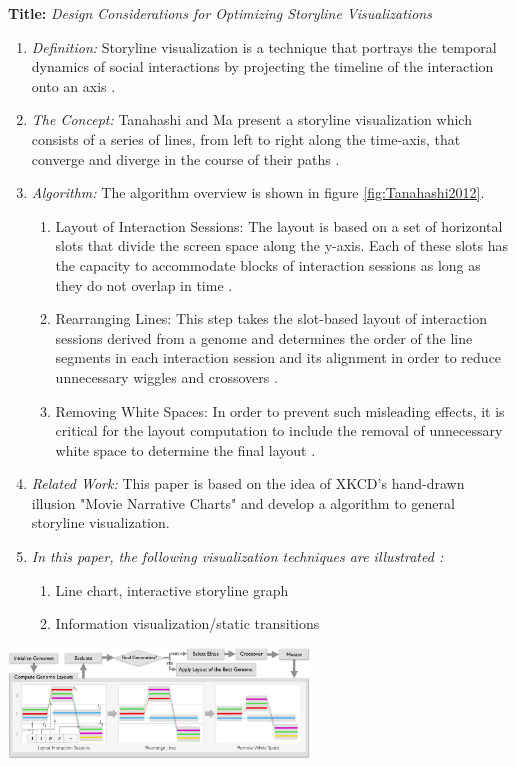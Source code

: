\documentclass{egpubl}
\begin{document}
\textbf{Title:} \textit{Design Considerations for Optimizing Storyline Visualizations}
\begin{enumerate}
\item \textit{Definition:} Storyline visualization is a technique that portrays the temporal dynamics of social interactions by projecting the timeline of the interaction onto an axis \cite{Tanahashi}.
\item \textit{The Concept:} Tanahashi and Ma present a storyline visualization which consists of a series of lines, from left to
right along the time-axis, that converge and diverge in the course of their paths \cite{Tanahashi}.
\item \textit{Algorithm:} The algorithm overview is shown in figure \ref{fig:Tanahashi2012}.
\begin{enumerate}
\item Layout of Interaction Sessions: The layout is based on a set of horizontal slots that divide the screen space along the y-axis. Each of these slots has the capacity to accommodate blocks of interaction sessions as long as they do not overlap in time \cite{Tanahashi}.
\item Rearranging Lines: This step takes the slot-based layout of interaction sessions derived from a genome and determines the order of the line segments in each interaction session and its alignment in order to reduce unnecessary wiggles and crossovers \cite{Tanahashi}.
\item Removing White Spaces: In order to prevent such misleading effects, it is critical for the layout computation to include the removal of unnecessary white space to determine the final layout \cite{Tanahashi}.
\end{enumerate}
\item \textit{Related Work:}  This paper is based on the idea of XKCD's hand-drawn illusion "Movie Narrative Charts" \cite{Ogievetsky2009} and develop a algorithm to general storyline visualization.
\item \textit{In this paper, the following visualization techniques are illustrated :} 
\begin{enumerate}
\item Line chart, interactive storyline graph
\item Information visualization/static transitions
\end{enumerate}
\end{enumerate}

\begingroup
\centering
\includegraphics[width=8cm]{./images/Tanahashi2012}
\label{fig:Tanahashi2012}
\endgroup
\end{document}
